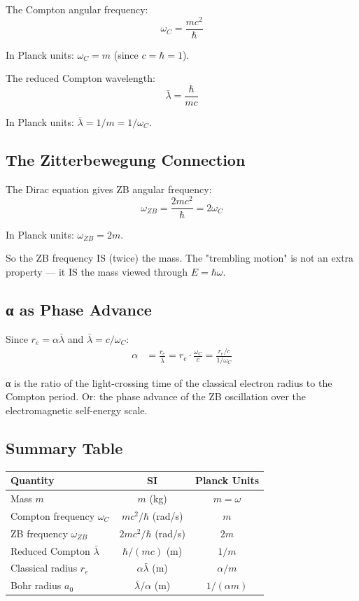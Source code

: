 \documentclass{article}
\begin{document}
The Compton angular frequency:
\begin{equation}
\omega_C = \frac{m c^2}{\hbar}
\end{equation}

In Planck units: $\omega_C = m$ (since $c = \hbar = 1$).

The reduced Compton wavelength:
\begin{equation}
\bar{\lambda} = \frac{\hbar}{m c}
\end{equation}

In Planck units: $\bar{\lambda} = 1/m = 1/\omega_C$.

\subsection{The Zitterbewegung Connection}

The Dirac equation gives ZB angular frequency:
\begin{equation}
\omega_{ZB} = \frac{2 m c^2}{\hbar} = 2\omega_C
\end{equation}

In Planck units: $\omega_{ZB} = 2m$.

So the ZB frequency IS (twice) the mass. The "trembling motion" is not
an extra property — it IS the mass viewed through $E = \hbar\omega$.

\subsection{α as Phase Advance}

Since $r_e = \alpha \bar{\lambda}$ and $\bar{\lambda} = c/\omega_C$:
\begin{align}
\alpha &= \frac{r_e}{\bar{\lambda}}
       = r_e \cdot \frac{\omega_C}{c}
       = \frac{r_e / c}{1 / \omega_C}
\end{align}

α is the ratio of the light-crossing time of the classical electron
radius to the Compton period. Or: the phase advance of the ZB
oscillation over the electromagnetic self-energy scale.

\subsection{Summary Table}

\begin{center}
\begin{tabular}{lcc}
\hline
Quantity & SI & Planck Units \\
\hline
Mass $m$ & $m$ (kg) & $m = \omega$ \\
Compton frequency $\omega_C$ & $mc^2/\hbar$ (rad/s) & $m$ \\
ZB frequency $\omega_{ZB}$ & $2mc^2/\hbar$ (rad/s) & $2m$ \\
Reduced Compton $\bar{\lambda}$ & $\hbar/(mc)$ (m) & $1/m$ \\
Classical radius $r_e$ & $\alpha\bar{\lambda}$ (m) & $\alpha/m$ \\
Bohr radius $a_0$ & $\bar{\lambda}/\alpha$ (m) & $1/(\alpha m)$ \\
\hline
\end{tabular}
\end{center}
\end{document}
